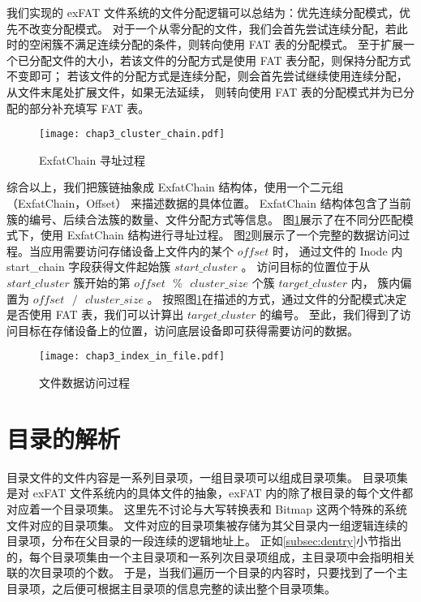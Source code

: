 我们实现的 exFAT 文件系统的文件分配逻辑可以总结为：优先连续分配模式，优先不改变分配模式。
对于一个从零分配的文件，我们会首先尝试连续分配，若此时的空闲簇不满足连续分配的条件，则转向使用 FAT 表的分配模式。
至于扩展一个已分配文件的大小，若该文件的分配方式是使用 FAT 表分配，则保持分配方式不变即可；
若该文件的分配方式是连续分配，则会首先尝试继续使用连续分配，从文件末尾处扩展文件，如果无法延续，
则转向使用 FAT 表的分配模式并为已分配的部分补充填写 FAT 表。

\begin{figure}[h]
    \centering
    \texttt{[image: chap3\_cluster\_chain.pdf]}
    \caption{ExfatChain 寻址过程}
    \label{fig:cluster_chain}
\end{figure}

综合以上，我们把簇链抽象成 ExfatChain 结构体，使用一个二元组 （ExfatChain，Offset） 来描述数据的具体位置。
ExfatChain 结构体包含了当前簇的编号、后续合法簇的数量、文件分配方式等信息。
图\ref{fig:cluster_chain}展示了在不同分匹配模式下，使用 ExfatChain 结构进行寻址过程。
图\ref{fig:index_in_file}则展示了一个完整的数据访问过程。当应用需要访问存储设备上文件内的某个 $ offset $ 时，
通过文件的 Inode 内 start\_chain 字段获得文件起始簇 $ start\_cluster $ 。
访问目标的位置位于从 $ start\_cluster $ 簇开始的第 $ offset \text{ }\%\text{ } cluster\_size $ 个簇 $ target\_cluster $ 内，
簇内偏置为 $ offset \text{ }/\text{ } cluster\_size $ 。
按照图\ref{fig:cluster_chain}在描述的方式，通过文件的分配模式决定是否使用 FAT 表，我们可以计算出 $ target\_cluster $ 的编号。
至此，我们得到了访问目标在存储设备上的位置，访问底层设备即可获得需要访问的数据。

\begin{figure}[h]
    \centering
    \texttt{[image: chap3\_index\_in\_file.pdf]}
    \caption{文件数据访问过程}
    \label{fig:index_in_file}
\end{figure}

\section{目录的解析}\label{sec:dentry}
目录文件的文件内容是一系列目录项，一组目录项可以组成目录项集。
目录项集是对 exFAT 文件系统内的具体文件的抽象，exFAT 内的除了根目录的每个文件都对应着一个目录项集。
这里先不讨论与大写转换表和 Bitmap 这两个特殊的系统文件对应的目录项集。
文件对应的目录项集被存储为其父目录内一组逻辑连续的目录项，分布在父目录的一段连续的逻辑地址上。
正如\ref{subsec:dentry}小节指出的，每个目录项集由一个主目录项和一系列次目录项组成，主目录项中会指明相关联的次目录项的个数。
于是，当我们遍历一个目录的内容时，只要找到了一个主目录项，之后便可根据主目录项的信息完整的读出整个目录项集。

